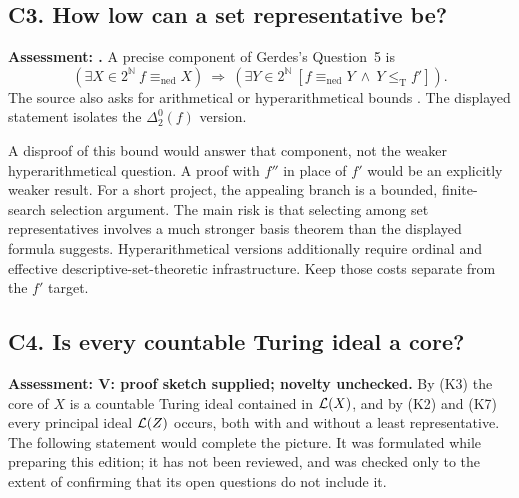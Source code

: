 \documentclass[11pt,a4paper]{article}
\newcommand{\N}{\mathbb N}
\newcommand{\Cantor}{2^{\N}}
\newcommand{\leT}{\leq_{\mathrm T}}
\newcommand{\problemheading}[3]{\subsection{#1. #2}\label{entry:#1}\noindent\textbf{Assessment: #3.}\enspace}
\theoremstyle{definition}\newtheorem{definition}[theorem]{Definition}
\theoremstyle{remark}\newtheorem{remark}[theorem]{Remark}
\begin{document}
\problemheading{C3}{How low can a set representative be?}{\E{}}
A precise component of Gerdes's Question~5 is
\[
 (\exists X\in\Cantor\ f\equiv_{\mathrm{ned}}X)
 \ \Longrightarrow\
 (\exists Y\in\Cantor\ [f\equiv_{\mathrm{ned}}Y\ \land\ Y\leT f']).
\]
The source also asks for arithmetical or hyperarithmetical bounds \cite{Gerdes}. The displayed statement isolates the $\Delta^0_2(f)$ version.

A disproof of this bound would answer that component, not the weaker hyperarithmetical question. A proof with $f''$ in place of $f'$ would be an explicitly weaker result. For a short project, the appealing branch is a bounded, finite-search selection argument. The main risk is that selecting among set representatives involves a much stronger basis theorem than the displayed formula suggests. Hyperarithmetical versions additionally require ordinal and effective descriptive-set-theoretic infrastructure. Keep those costs separate from the $f'$ target.

\problemheading{C4}{Is every countable Turing ideal a core?}{V: proof sketch supplied; novelty unchecked}
By (K3) the core of $X$ is a countable Turing ideal contained in $\mathcal L(X)$, and by (K2) and (K7) every principal ideal $\mathcal L(Z)$ occurs, both with and without a least representative. The following statement would complete the picture. It was formulated while preparing this edition; it has not been reviewed, and \cite{HJKS} was checked only to the extent of confirming that its open questions do not include it.
\end{document}

